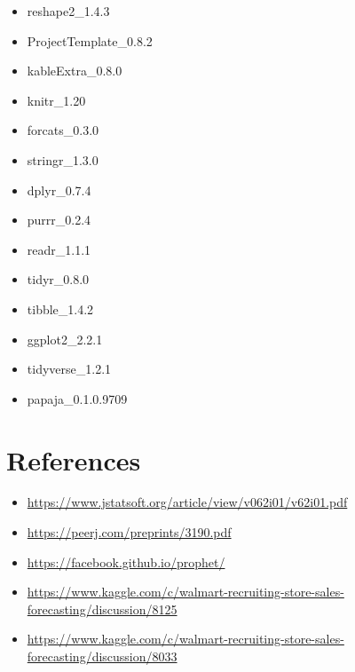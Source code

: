\documentclass[floatsintext,man]{apa6}
\providecommand{\tightlist}{%
  \setlength{\itemsep}{0pt}\setlength{\parskip}{0pt}}
\theoremstyle{definition}
\theoremstyle{definition}
\theoremstyle{definition}
\theoremstyle{remark}
\begin{document}
\begin{itemize}
\item
  reshape2\_1.4.3\\
\item
  ProjectTemplate\_0.8.2
\item
  kableExtra\_0.8.0
\item
  knitr\_1.20\\
\item
  forcats\_0.3.0
\item
  stringr\_1.3.0
\item
  dplyr\_0.7.4
\item
  purrr\_0.2.4\\
\item
  readr\_1.1.1\\
\item
  tidyr\_0.8.0
\item
  tibble\_1.4.2
\item
  ggplot2\_2.2.1\\
\item
  tidyverse\_1.2.1
\item
  papaja\_0.1.0.9709
\end{itemize}

\newpage

\section{References}\label{references}

\begin{itemize}
\tightlist
\item
  \url{https://www.jstatsoft.org/article/view/v062i01/v62i01.pdf}
\item
  \url{https://peerj.com/preprints/3190.pdf}
\item
  \url{https://facebook.github.io/prophet/}
\item
  \url{https://www.kaggle.com/c/walmart-recruiting-store-sales-forecasting/discussion/8125}
\item
  \url{https://www.kaggle.com/c/walmart-recruiting-store-sales-forecasting/discussion/8033}
\end{itemize}

\begingroup
\setlength{\parindent}{-0.5in} \setlength{\leftskip}{0.5in}

\hypertarget{refs}{}

\endgroup
\end{document}
